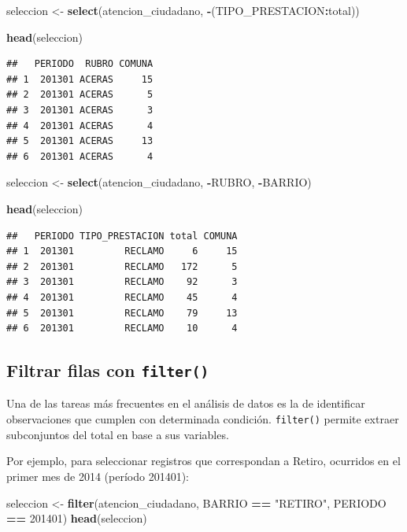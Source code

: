 \documentclass[]{book}
\newenvironment{Shaded}{\begin{snugshade}}{\end{snugshade}}
\newcommand{\KeywordTok}[1]{\textcolor[rgb]{0.13,0.29,0.53}{\textbf{#1}}}
\newcommand{\DecValTok}[1]{\textcolor[rgb]{0.00,0.00,0.81}{#1}}
\newcommand{\StringTok}[1]{\textcolor[rgb]{0.31,0.60,0.02}{#1}}
\newcommand{\OperatorTok}[1]{\textcolor[rgb]{0.81,0.36,0.00}{\textbf{#1}}}
\newcommand{\NormalTok}[1]{#1}
\begin{document}
\begin{Shaded}
\begin{Highlighting}[]
\NormalTok{seleccion <-}\StringTok{ }\KeywordTok{select}\NormalTok{(atencion_ciudadano, }\OperatorTok{-}\NormalTok{(TIPO_PRESTACION}\OperatorTok{:}\NormalTok{total))}

\KeywordTok{head}\NormalTok{(seleccion)}
\end{Highlighting}
\end{Shaded}

\begin{verbatim}
##   PERIODO  RUBRO COMUNA
## 1  201301 ACERAS     15
## 2  201301 ACERAS      5
## 3  201301 ACERAS      3
## 4  201301 ACERAS      4
## 5  201301 ACERAS     13
## 6  201301 ACERAS      4
\end{verbatim}

\begin{Shaded}
\begin{Highlighting}[]
\NormalTok{seleccion <-}\StringTok{ }\KeywordTok{select}\NormalTok{(atencion_ciudadano, }\OperatorTok{-}\NormalTok{RUBRO, }\OperatorTok{-}\NormalTok{BARRIO)}

\KeywordTok{head}\NormalTok{(seleccion)}
\end{Highlighting}
\end{Shaded}

\begin{verbatim}
##   PERIODO TIPO_PRESTACION total COMUNA
## 1  201301         RECLAMO     6     15
## 2  201301         RECLAMO   172      5
## 3  201301         RECLAMO    92      3
## 4  201301         RECLAMO    45      4
## 5  201301         RECLAMO    79     13
## 6  201301         RECLAMO    10      4
\end{verbatim}

\subsection{\texorpdfstring{Filtrar filas con
\texttt{filter()}}{Filtrar filas con filter()}}\label{filtrar-filas-con-filter}

Una de las tareas más frecuentes en el análisis de datos es la de
identificar observaciones que cumplen con determinada condición.
\texttt{filter()} permite extraer subconjuntos del total en base a sus
variables.

Por ejemplo, para seleccionar registros que correspondan a Retiro,
ocurridos en el primer mes de 2014 (período 201401):

\begin{Shaded}
\begin{Highlighting}[]
\NormalTok{seleccion <-}\StringTok{ }\KeywordTok{filter}\NormalTok{(atencion_ciudadano, BARRIO }\OperatorTok{==}\StringTok{ "RETIRO"}\NormalTok{, PERIODO }\OperatorTok{==}\StringTok{ }\DecValTok{201401}\NormalTok{)}
\KeywordTok{head}\NormalTok{(seleccion)}
\end{Highlighting}
\end{Shaded}
\end{document}
